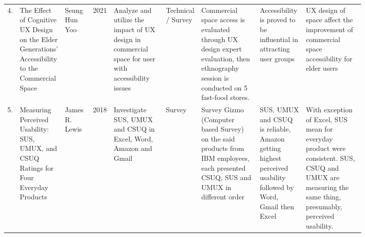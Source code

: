 \documentclass[
  11pt, %
]{assignment}
\begin{document}
\begin{landscape}
\begin{longtable}[l]{r | p{0.075\linewidth} p{0.08\linewidth} m{0.02\linewidth} p{0.15\linewidth} p{0.05\linewidth} p{0.17\linewidth} p{0.13\linewidth} p{0.17\linewidth}}
    4. & The Effect of Cognitive UX Design on the Elder Generations' Accessibility to the Commercial Space                                                     & Seung Hun Yoo                                                                                                               & 2021 & Analyze and utilize the impact of UX design in commercial space for user with accessibility issues                       & Technical / Survey & Commercial space access is evaluated through UX design expert evaluation, then ethnography session is conducted on 5 fast-food stores. & Accessibility is proved to be influential in attracting user groups                                                                                                         & UX design of space affect the improvement of commercial space accessibility for elder users                                                                                                                                                                                                                                                                  \\
    5. & Measuring Perceived Usability: SUS, UMUX, and CSUQ Ratings for Four Everyday Products                                                                 & James R. Lewis                                                                                                              & 2018 & Investigate SUS, UMUX and CSUQ in Excel, Word, Amazon and Gmail                                                          & Survey             & Survey Gizmo (Computer based Survey) on the said products from IBM employees, each presented CSUQ, SUS and UMUX in different order     & SUS, UMUX and CSUQ is reliable, Amazon getting highest perceived usability followed by Word, Gmail then Excel                                                               & With exception of Excel, SUS mean for everyday product were consistent. SUS, CSUQ and UMUX are measuring the same thing, presumably, perceived usability.                                                                                                                                                                                                    \\

\end{longtable}
\end{landscape}
\end{document}
